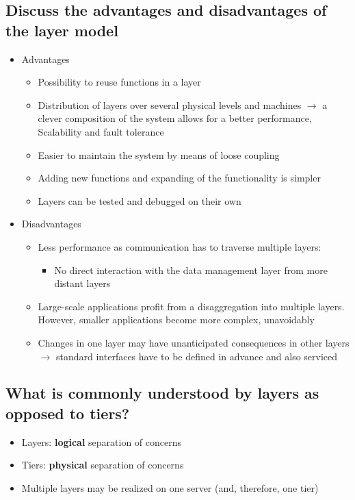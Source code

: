 \documentclass{article}
\begin{document}
\subsection{Discuss the advantages and disadvantages of the layer model}
\begin{itemize}
    \item Advantages
          \begin{itemize}
              \item Possibility to reuse functions in a layer
              \item Distribution of layers over several physical levels and machines \(\rightarrow\) a clever composition of the system allows for a better performance, Scalability and fault tolerance
              \item Easier to maintain the system by means of loose coupling
              \item Adding new functions and expanding of the functionality is simpler
              \item Layers can be tested and debugged on their own
          \end{itemize}
    \item Disadvantages
          \begin{itemize}
              \item Less performance as communication has to traverse multiple layers:
                    \begin{itemize}
                        \item No direct interaction with the data management layer from more distant layers
                    \end{itemize}
              \item Large-scale applications profit from a disaggregation into multiple layers. However, smaller applications become more complex, unavoidably
              \item Changes in one layer may have unanticipated consequences in other layers \(\rightarrow\) standard interfaces have to be defined in advance and also serviced
          \end{itemize}
\end{itemize}

\subsection{What is commonly understood by layers as opposed to tiers?}
\begin{itemize}
    \item Layers: \textbf{logical} separation of concerns
    \item Tiers: \textbf{physical} separation of concerns
    \item Multiple layers may be realized on one server (and, therefore, one tier)
\end{itemize}
\end{document}
